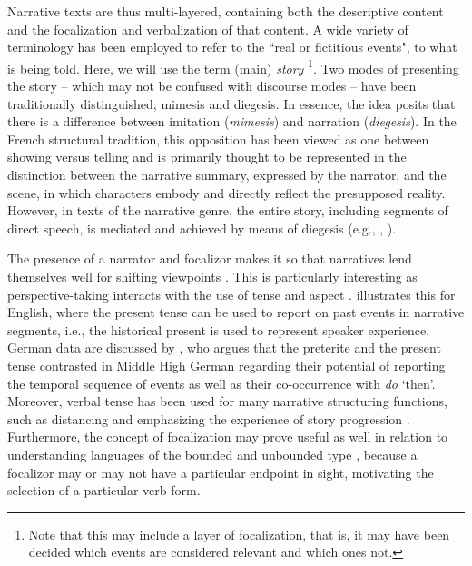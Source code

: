 \documentclass[output=paper,colorlinks,citecolor=brown]{langscibook}
\begin{document}
Narrative texts are thus multi-layered, containing both the descriptive content and the focalization and verbalization of that content. A wide variety of terminology has been employed to refer to the ``real or fictitious events", to what is being told. Here, we will use the term (main) \textit{story} \citep{Genette1980, Jong2004}\footnote{Note that this may include a layer of focalization, that is, it may have been decided which events are considered relevant and which ones not.}. Two modes of presenting the story --  which may not be confused with discourse modes -- have been traditionally distinguished, mimesis and diegesis. In essence, the idea posits that there is a difference between imitation (\textit{mimesis}) and narration (\textit{diegesis}). In the French structural tradition, this opposition has been viewed as one between showing versus telling \citep{Chatman1978} and is primarily thought to be represented in the distinction between the narrative summary, expressed by the narrator, and the scene, in which characters embody and directly reflect the presupposed reality. However, in texts of the narrative genre, the entire story, including segments of direct speech, is mediated and achieved by means of diegesis (e.g., \citealt[108]{RimmonKenan1983}, \citealt[28]{Fludernik1993}).

The presence of a narrator and focalizor makes it so that narratives lend themselves well for shifting viewpoints \citep[see e.g., the contributions in][]{Dancygier2012}. This is particularly interesting as perspective-taking interacts with the use of tense and aspect \citep{Fleischmann1988}. \citet{Schiffrin1981} illustrates this for English, where the present tense can be used to report on past events in narrative segments, i.e., the historical present is used to represent speaker experience. 
German data are discussed by \citet{Zeman2018}, who argues that the preterite and the present tense contrasted in Middle High German regarding their potential of reporting the temporal sequence of events as well as their co-occurrence with \textit{do} `then'. Moreover, verbal tense has been used for many narrative structuring functions, such as distancing \citep{Declerck2003} and emphasizing the experience of story progression \citep[30]{Hoffman2023}. Furthermore, the concept of focalization may prove useful as well in relation to understanding  languages of the bounded and unbounded type \citep{carroll2002typology}, because a focalizor may or may not have a particular endpoint in sight, motivating the selection of a particular verb form. 
\end{document}
